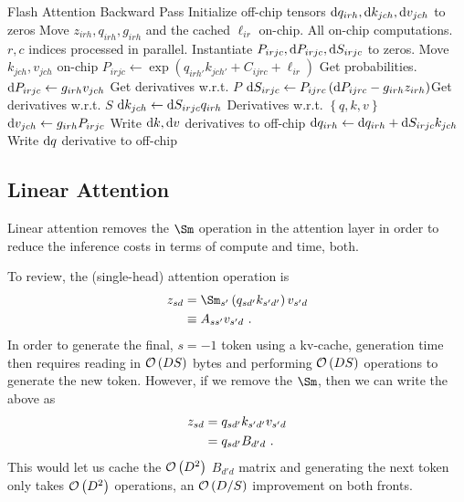 \begin{algo}{Flash Attention Backward Pass}
\State Initialize off-chip tensors $ {\rm d} q _{ irh }, {\rm d} k _{ jch }, {\rm d} v _{ jch }  $ to zeros
\State Move  $ z _{ irh }, q _{ irh }, g _{ irh }$ and the cached $ \ell _{ ir } $ on-chip.
 \Comment All on-chip computations. $ r, c $ indices processed in parallel.
    \State Instantiate $ P _{ irjc },{\rm d} P _{ irjc } ,{\rm d} S _{ irjc } $  to zeros.
    \State Move  $ k_{ jch },v _{ jch }$ on-chip
    \State $ P _{ irjc } \gets   \exp \left (q _{ irh' } k _{ jch' } + C _{ ijrc } + \ell _{ ir } \right )$ \Comment Get probabilities.
    \State $ {\rm d} P _{ irjc } \gets   g _{ irh} v _{ jch }$ \Comment Get derivatives w.r.t. $ P $
    \State $ {\rm d} S _{ irjc } \gets  P _{ ijrc }\left ( {\rm d} P _{ ijrc } - g _{ irh } z _{ irh }  \right ) $\Comment Get derivatives w.r.t. $ S $
    \State $ {\rm d} k _{ jch } \gets  {\rm d} S _{ irjc }  q _{ irh }$ \Comment Derivatives w.r.t. $ \left \{q,  k, v \right \} $
    \State $ {\rm d} v _{ jch } \gets  g _{ irh }P _{ irjc }$
    \State Write $ {\rm d} k, {\rm d} v $  derivatives to off-chip
    \State $ {\rm d} q _{ irh } \gets {\rm d} q _{ irh }+ {\rm d} S _{ irjc }  k _{ jch } $
\EndFor
\State Write $ {\rm d} q $  derivative to off-chip
\EndFor
\label{algo_fa_bwd_advanced}
\end{algo}


\subsection{Linear Attention \label{subsec_linear_attn}}

Linear attention \cite{katharopoulos2020transformersrnnsfastautoregressive} removes the $ \Sm $ operation in the attention layer in order to reduce the inference costs in terms of
compute and time, both.

To review, the (single-head) attention operation is
\begin{align}
    z _{ sd } &= \Sm_{ s' }\left ( q _{ sd' } k _{ s'd' }  \right ) v _{ s'd }\nn
     &\equiv A _{ s s' } v _{ s'd } \ .
\end{align}
In order to generate the final, $ s=-1 $ token using a kv-cache, generation time then requires
reading in $ \mathcal{O} \left( DS \right)  $ bytes and performing $ \mathcal{O} \left( DS \right)  $ operations
to generate the new token. However, if we remove the $ \Sm $, then we can write the above as
\begin{align}
    z _{ sd } &=  q _{ sd' } k _{ s'd' }  v _{ s'd }\nonumber\\
         &= q _{ sd' }B _{d' d }  \ .
\end{align}
This would let us cache the $ \mathcal{O} \left( D ^{ 2 } \right)  $ $ B _{ d'd } $ matrix and generating
the next token only takes $ \mathcal{O} \left( D ^{ 2 } \right)  $ operations, an $ \mathcal{O} \left( D/S
\right) $ improvement on both fronts.

